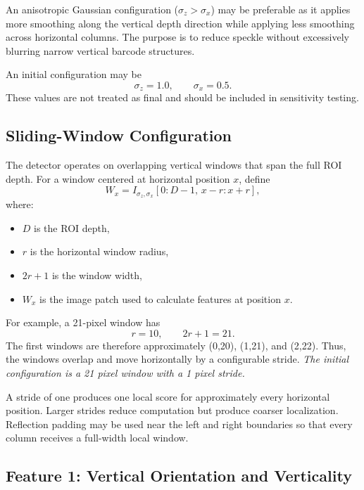 \documentclass[11pt]{article}
\begin{document}
An anisotropic Gaussian configuration ($\sigma_z > \sigma_x$) may be preferable as it applies more smoothing along the vertical depth direction while applying
less smoothing across horizontal columns. The purpose is to reduce speckle
without excessively blurring narrow vertical barcode structures.

An initial configuration may be
\[
\sigma_z=1.0,
\qquad
\sigma_x=0.5.
\]
These values are not treated as final and should be included in sensitivity
testing.


\subsection{Sliding-Window Configuration}
The detector operates on overlapping vertical windows that span the full ROI
depth.
For a window centered at horizontal position \(x\), define
\[
W_x
=
I_{\sigma_z,\sigma_x}
\left[
0:D-1,\,
x-r:x+r
\right],
\]
where:
\begin{itemize}
    \item \(D\) is the ROI depth,
    \item \(r\) is the horizontal window radius,
    \item \(2r+1\) is the window width,
    \item \(W_x\) is the image patch used to calculate features at position
    \(x\).
\end{itemize}
For example, a 21-pixel window has
\[
r=10,
\qquad
2r+1=21.
\]
The first windows are therefore approximately (0,20), (1,21), and (2,22).
Thus, the windows overlap and move horizontally by a configurable stride.
\emph{The initial configuration is a 21 pixel window with a 1 pixel stride.}

A stride of one produces one local score for approximately every horizontal
position. Larger strides reduce computation but produce coarser localization.
Reflection padding may be used near the left and right boundaries so that every
column receives a full-width local window.


\subsection{Feature 1: Vertical Orientation and Verticality}
\end{document}
